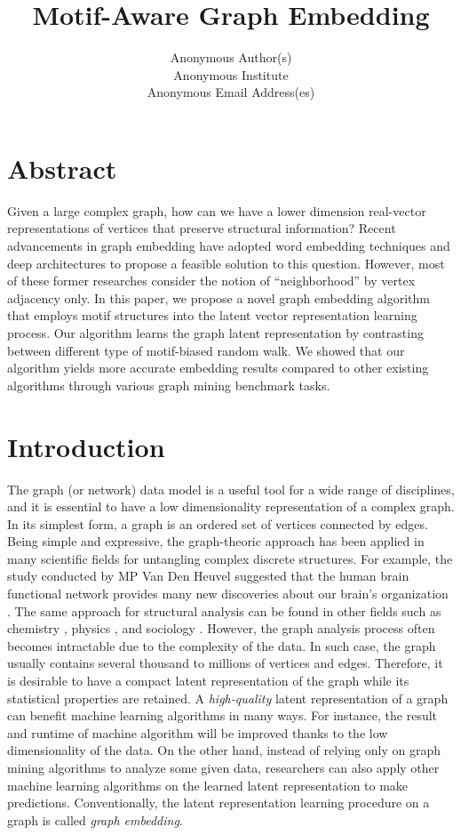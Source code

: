 \documentclass[letterpaper]{article}
\title{Motif-Aware Graph Embedding}
\author{
    Anonymous Author(s) \\
    Anonymous Institute \\
    Anonymous Email Address(es) \\
}
\begin{document}
    \maketitle

    \section{Abstract}
       Given a large complex graph, how can we have a lower dimension real-vector representations 
       of vertices that preserve structural information? Recent advancements in graph embedding 
       have adopted word embedding techniques and deep architectures to propose a feasible solution 
       to this question. However, most of these former researches consider the notion of ``neighborhood'' 
       by vertex adjacency only. In this paper, we propose a novel graph embedding algorithm that employs 
       motif structures into the latent vector representation learning process. Our algorithm learns 
       the graph latent representation by contrasting between different type of motif-biased random walk. 
       We showed that our algorithm yields more accurate embedding results compared to other existing 
       algorithms through various graph mining benchmark tasks.

    \setcounter{secnumdepth}{2}
    \section{Introduction}
        The graph (or network) data model is a useful tool for a wide range of disciplines, and
        it is essential to have a low dimensionality representation of a complex graph. In its
        simplest form, a graph is an ordered set of vertices connected by edges. Being simple
        and expressive, the graph-theoric approach has been applied in many scientific fields
        for untangling complex discrete structures. For example, the study conducted by 
        MP Van Den Heuvel suggested that the human brain functional network provides many new
        discoveries about our brain's organization \cite{BrainNetHeuvel}. The same approach
        for structural analysis can be found in other fields such as chemistry \cite{molecule}, 
        physics \cite{physicnet}, and sociology \cite{socialnet}. However, the graph analysis
        process often becomes intractable due to the complexity of the data. In such case,
        the graph usually contains several thousand to millions of vertices and edges.
        Therefore, it is desirable to have a compact latent representation of the graph while
        its statistical properties are retained. A \emph{high-quality} latent representation
        of a graph can benefit machine learning algorithms in many ways. For instance, 
        the result and runtime of machine algorithm will be improved thanks to the low
        dimensionality of the data. On the other hand, instead of relying only on graph 
        mining algorithms to analyze some given data, researchers can also apply other
        machine learning algorithms on the learned latent representation to make predictions.
        Conventionally, the latent representation learning procedure on a graph is called
        \emph{graph embedding}.
\end{document}
